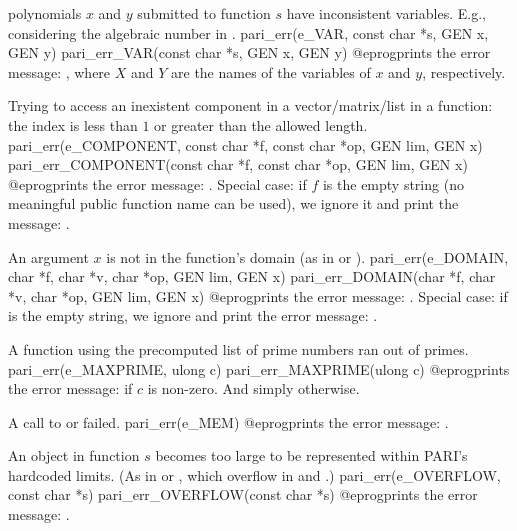  polynomials $x$ and $y$ submitted to function $s$ have
inconsistent variables. E.g., considering the algebraic number
 in .
\bprog
  pari_err(e_VAR, const char *s, GEN x, GEN y)
  pari_err_VAR(const char *s, GEN x, GEN y)
@eprog\noindent prints the error message: , where $X$ and $Y$ are the names of the variables of $x$ and $y$,
respectively.


 Trying to access an inexistent component in a
vector/matrix/list in a function: the index is less than $1$ or greater
than the allowed length.
\bprog
  pari_err(e_COMPONENT, const char *f, const char *op, GEN lim, GEN x)
  pari_err_COMPONENT(const char *f, const char *op, GEN lim, GEN x)
@eprog\noindent prints the error message: . Special case: if $f$ is the empty string (no
meaningful public function name can be used), we ignore it and print the
message: .

 An argument $x$ is not in the function's domain (as in
 or ).
\bprog
  pari_err(e_DOMAIN, char *f, char *v, char *op, GEN lim, GEN x)
  pari_err_DOMAIN(char *f, char *v, char *op, GEN lim, GEN x)
@eprog\noindent prints the error message: . Special case: if  is the empty string, we ignore
 and print the error message: .

 A function using the precomputed list of prime numbers
ran out of primes.
\bprog
  pari_err(e_MAXPRIME, ulong c)
  pari_err_MAXPRIME(ulong c)
@eprog\noindent prints the error message:  if $c$ is non-zero. And simply  otherwise.

 A call to  or  failed.
\bprog
  pari_err(e_MEM)
@eprog\noindent prints the error message: .

 An object in function $s$ becomes too large to be
represented within PARI's hardcoded limits. (As in 
or , which overflow in  and .)
\bprog
  pari_err(e_OVERFLOW, const char *s)
  pari_err_OVERFLOW(const char *s)
@eprog\noindent prints the error message: .

